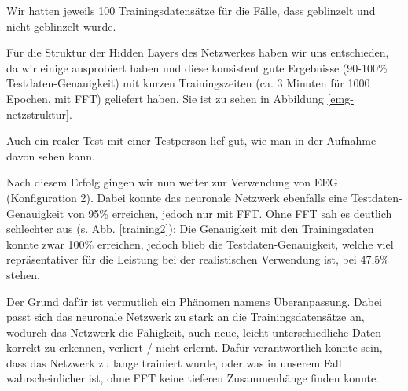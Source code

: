 \documentclass[11pt]{scrartcl}
\begin{document}
	
	Wir hatten jeweils 100 Trainingsdatensätze für die Fälle, dass geblinzelt und nicht geblinzelt wurde.

	Für die Struktur der Hidden Layers des Netzwerkes haben wir uns entschieden, da wir einige ausprobiert haben und diese konsistent gute Ergebnisse (90-100\% Testdaten-Genauigkeit) mit kurzen Trainingszeiten (ca. 3 Minuten für 1000 Epochen, mit FFT) geliefert haben. Sie ist zu sehen in Abbildung \ref{emg-netzstruktur}.

	\begin{figure}[H]
	\end{figure}

	Auch ein realer Test mit einer Testperson lief gut, wie man in der Aufnahme davon sehen kann. \cite{projekt-video}

	Nach diesem Erfolg gingen wir nun weiter zur Verwendung von EEG (Konfiguration 2). Dabei konnte das neuronale Netzwerk ebenfalls eine Testdaten-Genauigkeit von 95\% erreichen, jedoch nur mit FFT. Ohne FFT sah es deutlich schlechter aus (s. Abb. \ref{training2}): Die Genauigkeit mit den Trainingsdaten konnte zwar 100\% erreichen, jedoch blieb die Testdaten-Genauigkeit, welche viel repräsentativer für die Leistung bei der realistischen Verwendung ist, bei 47,5\% stehen.

	Der Grund dafür ist vermutlich ein Phänomen namens Überanpassung. Dabei passt sich das neuronale Netzwerk zu stark an die Trainingsdatensätze an, wodurch das Netzwerk die Fähigkeit, auch neue, leicht unterschiedliche Daten korrekt zu erkennen, verliert / nicht erlernt. Dafür verantwortlich könnte sein, dass das Netzwerk zu lange trainiert wurde, oder was in unserem Fall wahrscheinlicher ist, ohne FFT keine tieferen Zusammenhänge finden konnte.
\end{document}
